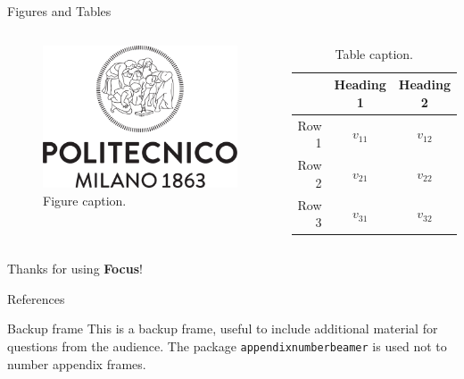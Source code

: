     \begin{frame}{Figures and Tables}
        \begin{columns}
                \begin{figure}
                    \centering
                    \includegraphics[scale=0.15]{../report/images/logo-polimi-transparent}
                    \caption{Figure caption.}
                    \label{fig:focuslogo}
                \end{figure}
                
                \begin{table}
                    \centering
                    \begin{tabular}{rcc}
                         & Heading 1 & Heading 2 \\\hline
                        Row 1 & \(v_{11}\) & \(v_{12}\) \\
                        Row 2 & \(v_{21}\) & \(v_{22}\) \\
                        Row 3 & \(v_{31}\) & \(v_{32}\) \\
                    \end{tabular}
                    \caption{Table caption.}
                    \label{tab:demo}
                \end{table}
        \end{columns}
    \end{frame}
    
    \begin{frame}
        Thanks for using \textbf{Focus}!
    \end{frame}

    \appendix
    \begin{frame}{References}
        \nocite{*}
        
        
    \end{frame}
    
    \begin{frame}{Backup frame}
        This is a backup frame, useful to include additional material for questions from the audience.
        \vfill
        The package \texttt{appendixnumberbeamer} is used not to number appendix frames.
    \end{frame}